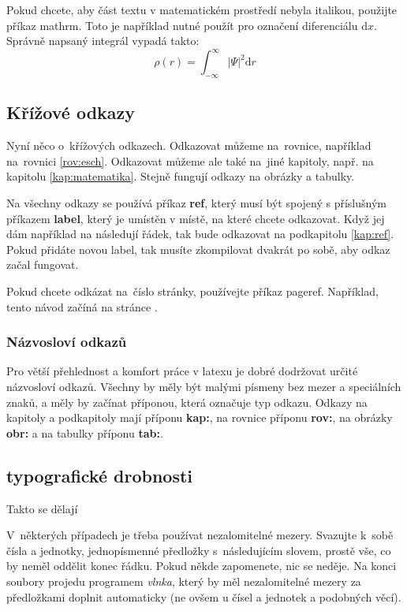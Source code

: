 Pokud chcete, aby část textu v matematickém prostředí nebyla italikou, použijte příkaz mathrm. Toto je například nutné použít pro označení diferenciálu d$x$.
Správně napsaný integrál vypadá takto:
\begin{equation}
\rho(r)=\int_{-\infty}^\infty |\Psi |^2 \mathrm{d}r
\end{equation}

\subsection{Křížové odkazy}
Nyní něco o~křížových odkazech. Odkazovat můžeme na~rovnice, například na~rovnici \ref{rov:esch}.
Odkazovat můžeme ale také na~jiné kapitoly, např. na kapitolu \ref{kap:matematika}. Stejně fungují odkazy na obrázky a tabulky.

Na všechny odkazy se používá příkaz \textbf{ref}, který musí být spojený s příslušným příkazem \textbf{label}, který je umístěn v místě, na které chcete odkazovat.
Když jej dám například na následují řádek, tak bude odkazovat na podkapitolu \ref{kap:ref}. Pokud přidáte novou label, tak musíte zkompilovat dvakrát po sobě, aby odkaz začal fungovat. 
\label{kap:ref}  

Pokud chcete odkázat na~číslo stránky, používejte příkaz pageref. Například, tento návod začíná na stránce \pageref{kap:navod}.
\subsubsection{Názvosloví odkazů}
Pro větší přehlednost a komfort práce v latexu je dobré dodržovat určité názvosloví odkazů. Všechny by měly být malými písmeny bez mezer a speciálních znaků, a měly by začínat příponou, která označuje typ odkazu. Odkazy na kapitoly a podkapitoly mají příponu \textbf{kap:}, na rovnice příponu \textbf{rov:}, na obrázky \textbf{obr:} a na tabulky příponu \textbf{tab:}.


\subsection{typografické drobnosti}
Takto se dělají 

V~některých případech je třeba používat nezalomitelné mezery. Svazujte k~sobě čísla a jednotky, jednopísmenné předložky s~následujícím slovem, prostě vše, co by neměl oddělit konec řádku. Pokud někde zapomenete, nic se neděje. Na konci soubory projedu programem \textit{vlnka}, který by měl nezalomitelné mezery za předložkami doplnit automaticky (ne ovšem u čísel a jednotek a podobných věcí).

